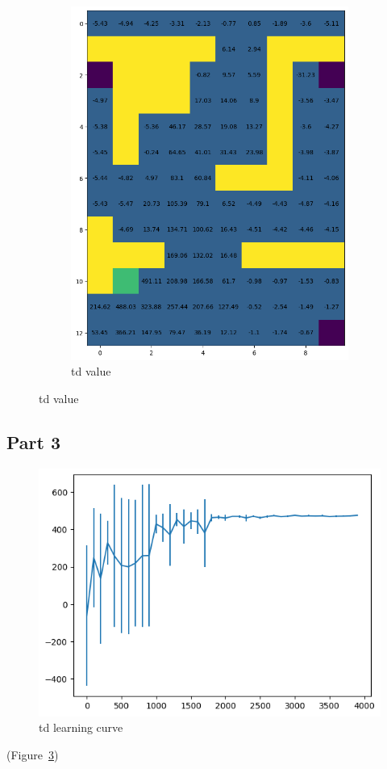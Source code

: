 \documentclass{article}
\begin{document}
\begin{figure}[h]
\begin{subfigure} {0.5\textwidth}
            \includegraphics[width=0.9\linewidth]{images/td_value}
            \caption{td value}\label{fig:td_value}
        \end{subfigure}
    \end{figure}

    \subsection{Part 3}\label{subsec:question-3-3}
    \begin{figure}[h]
        \includegraphics[width=0.9\linewidth]{images/td_learning_curve}
        \caption{td learning curve}\label{fig:td_learning_curve}
    \end{figure}
    (Figure~\ref{fig:td_learning_curve})
\end{document}
